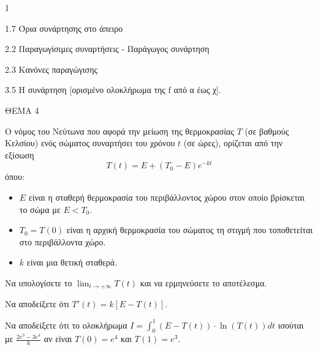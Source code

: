 \begin{ylh}{1}
    \item 1.7 Όρια συνάρτησης στο άπειρο
    \item 2.2 Παραγωγίσιμες συναρτήσεις - Παράγωγος συνάρτηση
    \item 2.3 Κανόνες παραγώγισης
    \item 3.5 Η συνάρτηση [ορισμένο ολοκλήρωμα της f από α έως χ].
\end{ylh}
ΘΕΜΑ 4

Ο νόμος του Νεύτωνα που αφορά την μείωση της θερμοκρασίας $T$ (σε βαθμούς Κελσίου) ενός σώματος συναρτήσει του χρόνου $t$ (σε ώρες), ορίζεται από την εξίσωση
\[ T(t) = E + (T_0 - E)e^{-kt} \]
όπου:
\begin{itemize}
    \item $E$ είναι η σταθερή θερμοκρασία του περιβάλλοντος χώρου στον οποίο βρίσκεται το σώμα με $E < T_0$.
    \item $T_0 = T(0)$ είναι η αρχική θερμοκρασία του σώματος τη στιγμή που τοποθετείται στο περιβάλλοντα χώρο.
    \item $k$ είναι μια θετική σταθερά.
\end{itemize}

\begin{alist}
    \item Να υπολογίσετε το $\lim_{t \to +\infty} T(t)$ και να ερμηνεύσετε το αποτέλεσμα. 
    \item Να αποδείξετε ότι $T'(t) = k[E - T(t)]$. 
    \item Να αποδείξετε ότι το ολοκλήρωμα $I = \int_0^1 (E - T(t)) \cdot \ln(T(t))dt$ ισούται με $\frac{2e^3-3e^4}{k}$ αν είναι $T(0) = e^4$ και $T(1) = e^3$. 
\end{alist}